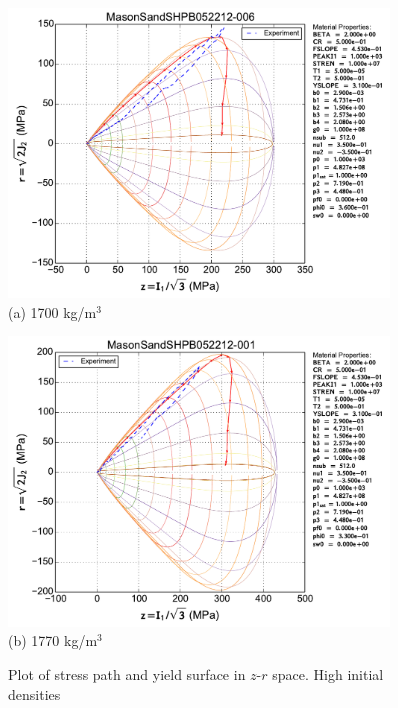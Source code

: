 \documentclass[11pt,a4paper]{article}
\begin{document}
\begin{appendices}
\begin{figure}[htbp!]
  \begin{minipage}{0.5\textwidth}
    \centering
    \includegraphics[width=0.9\textwidth]{FIGS/MasonSandSHPB052212-006_vs_expt_zr.pdf}\\
    (a) 1700 kg/m$^3$
  \end{minipage}
  \begin{minipage}{0.5\textwidth}
    \centering
    \includegraphics[width=0.9\textwidth]{FIGS/MasonSandSHPB052212-001_vs_expt_zr.pdf}\\
    (b) 1770 kg/m$^3$
  \end{minipage}
  \caption{Plot of stress path and yield surface in $z$-$r$ space.
           High initial densities}
  \label{fig:shpb_dry_zr_density_1}
\end{figure}



\end{appendices}
\end{document}
